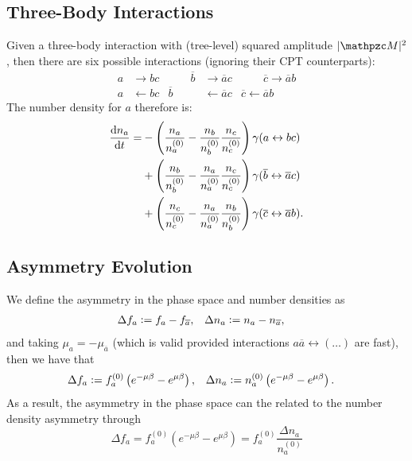 \documentclass[
  a4paper,             %
  11pt,                %
  oneside,             %
  onecolumn,           %
  bibliography=totoc,  %
  final,               %
]{scrartcl}
\begin{document}
\subsection{Three-Body Interactions}%
\label{sec:three-body_interactions}

Given a three-body interaction with (tree-level) squared amplitude
\(\abs{\pzcM}^2\), then there are six possible interactions (ignoring their
\gls{CPT} counterparts):
\begin{equation}
  \begin{aligned}
    a           & \to bc                         & \qquad
    \overline b & \to \overline ac               & \qquad
    \overline c \to \overline ab                          \\
    a           & \gets bc                       &
    \overline b & \gets \overline ac
                & \overline c \gets \overline ab
  \end{aligned}
\end{equation}
The number density for \(a\) therefore is:
\begin{equation}
  \begin{aligned}
    \frac{\mathop{}\!\mathrm{d}{n_a}}{\mathop{}\!\mathrm{d}{t}} =
     & - \left( \frac{n_a}{n_a^{(0)}} - \frac{n_b}{n_b^{(0)}} \frac{n_c}{n_c^{(0)}} \right) \gamma(a \leftrightarrow bc)                       \\
     & + \left( \frac{n_b}{n_b^{(0)}} - \frac{n_a}{n_a^{(0)}} \frac{n_c}{n_c^{(0)}} \right) \gamma(\overline b \leftrightarrow \overline a c)  \\
     & + \left( \frac{n_c}{n_c^{(0)}} - \frac{n_a}{n_a^{(0)}} \frac{n_b}{n_b^{(0)}} \right) \gamma(\overline c \leftrightarrow \overline a b).
  \end{aligned}
\end{equation}

\subsection{Asymmetry Evolution}%
\label{sec:asymmetry_evolution}

We define the asymmetry in the phase space and number densities as
\begin{align}
  \Delta f_a & \vcentcolon= f_a - f_{\overline a}, &
  \Delta n_a & \vcentcolon= n_a - n_{\overline a},
\end{align}
and taking \(\mu_a = - \mu_{\overline a}\) (which is valid provided
interactions \(a \overline a \leftrightarrow (\dots)\) are fast), then we have
that
\begin{align}
  \Delta f_a & \vcentcolon= f_a^{(0)} \left( e^{-\mu \beta} - e^{\mu \beta} \right), &
  \Delta n_a & \vcentcolon= n_a^{(0)} \left( e^{-\mu \beta} - e^{\mu \beta} \right).
\end{align}
As a result, the asymmetry in the phase space can the related to the number
density asymmetry through
\begin{equation}
  \Delta f_a = f_a^{(0)} \left( e^{-\mu \beta} - e^{\mu \beta} \right)
  = f_a^{(0)} \frac{\Delta n_a}{n_a^{(0)}}
\end{equation}
\end{document}
